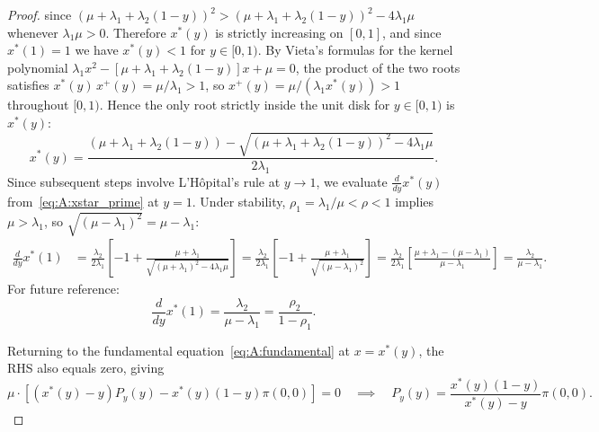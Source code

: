 \begin{proof}
    since $(\mu+\lambda_1+\lambda_2(1-y))^2>(\mu+\lambda_1+\lambda_2(1-y))^2-4\lambda_1\mu$
    whenever $\lambda_1\mu>0$. Therefore $x^*(y)$ is strictly increasing on $[0,1]$,
    and since $x^*(1)=1$ we have $x^*(y)<1$ for $y\in[0,1)$.
    By Vieta's formulas for the kernel polynomial
    $\lambda_1 x^2-[\mu+\lambda_1+\lambda_2(1-y)]x+\mu=0$, the product of the two
    roots satisfies $x^*(y)\,x^+(y)= \mu/\lambda_1>1$, so
    $x^+(y)=\mu/(\lambda_1 x^*(y))>1$ throughout $[0,1)$. Hence the only root
    strictly inside the unit disk for $y\in[0,1)$ is $x^*(y)$:
    \begin{equation}
        x^*(y) = \frac{
            (\mu +\lambda_1 + \lambda_2 (1-y))
            - \sqrt{(\mu +\lambda_1 + \lambda_2 (1-y))^2 - 4 \lambda_1 \mu}
        }{
            2\lambda_1
        }.
        \label{eq:A:xstar}
    \end{equation}
    Since subsequent steps involve L'H\^{o}pital's rule at $y\to 1$, we evaluate
    $\frac{d}{dy}x^*(y)$ from~\eqref{eq:A:xstar_prime} at $y=1$.
    Under stability, $\rho_1 = \lambda_1/\mu < \rho < 1$ implies $\mu>\lambda_1$, so
    $\sqrt{(\mu-\lambda_1)^2}=\mu-\lambda_1$:
    \begin{align*}
        \frac{d}{dy}x^*(1)
        &= \frac{\lambda_2}{2 \lambda_1}
        \left[
            -1 + \frac{
                \mu + \lambda_1
            }{
                \sqrt{(\mu+\lambda_1)^2- 4\lambda_1\mu}
            }
        \right]
        = \frac{\lambda_2}{2\lambda_1}
        \left[
            -1 + \frac{
                \mu + \lambda_1
            }{
                \sqrt{(\mu-\lambda_1)^2}
            }
        \right]
        = \frac{\lambda_2}{2\lambda_1}
        \left[
            \frac{\mu + \lambda_1 - (\mu - \lambda_1)}{\mu - \lambda_1}
        \right]
        = \frac{\lambda_2}{\mu - \lambda_1}.
    \end{align*}
    For future reference:
    \begin{equation}
        \frac{d}{dy}x^*(1) = \frac{\lambda_2}{\mu - \lambda_1} = \frac{\rho_2}{1-\rho_1}.
        \label{eq:A:xstar_deriv}
    \end{equation}

    Returning to the fundamental equation~\eqref{eq:A:fundamental} at $x=x^*(y)$,
    the RHS also equals zero, giving
    \begin{equation}
      \mu\cdot\left[(x^*(y)-y)P_y(y) - x^*(y)(1-y)\pi(0,0) \right]=0 \quad \implies \quad  P_y(y) = \frac{x^*(y)(1-y)}{x^*(y) - y} \pi(0,0). \label{eq:A:Py}
    \end{equation}


\end{proof}
